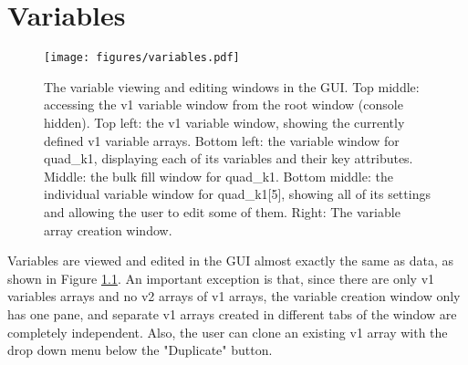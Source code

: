 \chapter{Variables}
\label{s:gui.variables}

\begin{figure}
\centering
\texttt{[image: figures/variables.pdf]}
\caption[The variable viewing and editing windows in the GUI.]{The variable viewing and editing windows in the GUI.
Top middle: accessing the v1 variable window from the root window (console hidden).
Top left: the v1 variable window, showing the currently defined v1 variable arrays.
Bottom left: the variable window for quad_k1, displaying each of its variables and their key attributes.
Middle: the bulk fill window for quad_k1.
Bottom middle: the individual variable window for quad_k1[5], showing all of its settings and allowing the user to edit some of them.
Right: The variable array creation window.}
\label{fig:gui.variables}
\end{figure}

Variables are viewed and edited in the GUI almost exactly the same as data, as shown in Figure \ref{fig:gui.variables}.
An important exception is that, since there are only v1 variables arrays and no v2 arrays of v1 arrays, the variable creation window only has one pane, and separate v1 arrays created in different tabs of the window are completely independent.
Also, the user can clone an existing v1 array with the drop down menu below the "Duplicate" button.

